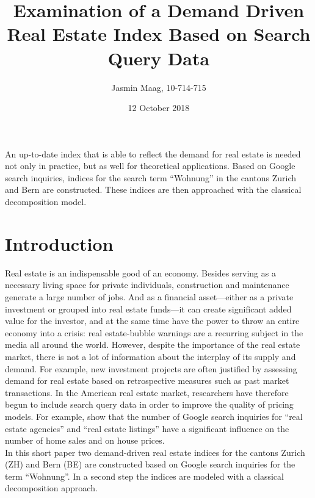 \documentclass[11pt]{article}
\title{\textbf{Examination of a Demand Driven Real Estate Index Based on Search Query Data}}
\author{Jasmin Maag, 10-714-715}
\date{12 October 2018}
\renewenvironment{abstract}
{\list{}{\rightmargin\leftmargin}%
	\item[\textbf{\hspace{10mm}Abstract.}]\relax}
{\endlist}
\begin{document}
\maketitle

\begin{abstract}
	An up-to-date index that is able to reflect the demand for real estate is needed not only in practice, but as well for theoretical applications. Based on Google search inquiries, indices for the search term ``Wohnung'' in the cantons Zurich and Bern are constructed. These indices are then approached with the classical decomposition model.
\end{abstract}

\section*{Introduction}
Real estate is an indispensable good of an economy. Besides serving as a necessary living space for private individuals, construction and maintenance generate a large number of jobs. And as a financial asset---either as a private investment or grouped into real estate funds---it can create significant added value for the investor, and at the same time have the power to throw an entire economy into a crisis: real estate-bubble warnings are a recurring subject in the media all around the world. However, despite the importance of the real estate market, there is not a lot of information about the interplay of its supply and demand. For example, new investment projects are often justified by assessing demand for real estate based on retrospective measures such as past market transactions.
In the American real estate market, researchers have therefore begun to include search query data in order to improve the quality of pricing models. For example, \cite{wubrynjolffsson} show that the number of Google search inquiries for ``real estate agencies'' and ``real estate listings'' have a significant influence on the number of home sales and on house prices.
 \\
 In this short paper two demand-driven real estate indices for the cantons Zurich (ZH) and Bern (BE) are constructed based on Google search inquiries for the term ``Wohnung''. In a second step the indices are modeled with a classical decomposition approach.
\end{document}
